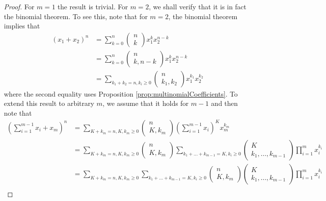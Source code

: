 \begin{proof}
For $m=1$ the result is trivial. For $m=2$, we shall verify that
it is in fact the binomial theorem. To see this, note that for $m=2$,
the binomial theorem implies that 
\begin{align*}
\left(x_{1}+x_{2}\right)^{n} & =\sum_{k=0}^{n}\left(\begin{array}{c}
n\\
k
\end{array}\right)x_{1}^{k}x_{2}^{n-k}\\
 & =\sum_{k=0}^{n}\left(\begin{array}{c}
n\\
k,n-k
\end{array}\right)x_{1}^{k}x_{2}^{n-k}\\
 & =\sum_{k_{1}+k_{2}=n,k_{i}\geq0}\left(\begin{array}{c}
n\\
k_{1},k_{2}
\end{array}\right)x_{1}^{k_{1}}x_{2}^{k_{2}}
\end{align*}
where the second equality uses Proposition \ref{prop:multinomialCoefficients}.
To extend this result to arbitrary $m$, we assume that it holds for
$m-1$ and then note that 
\begin{align*}
\left(\sum_{i=1}^{m-1}x_{i}+x_{m}\right)^{n} & =\sum_{K+k_{m}=n,K,k_{m}\geq0}\left(\begin{array}{c}
n\\
K,k_{m}
\end{array}\right)\left(\sum_{i=1}^{m-1}x_{i}\right)^{K}x_{m}^{k_{m}}\\
 & =\sum_{K+k_{m}=n,K,k_{m}\geq0}\left(\begin{array}{c}
n\\
K,k_{m}
\end{array}\right)\sum_{k_{1}+\ldots+k_{m-1}=K,k_{i}\geq0}\left(\begin{array}{c}
K\\
k_{1},\ldots,k_{m-1}
\end{array}\right)\prod_{i=1}^{m}x_{i}^{k_{i}}\\
 & =\sum_{K+k_{m}=n,K,k_{m}\geq0}\sum_{k_{1}+\ldots+k_{m-1}=K,k_{i}\geq0}\left(\begin{array}{c}
n\\
K,k_{m}
\end{array}\right)\left(\begin{array}{c}
K\\
k_{1},\ldots,k_{m-1}
\end{array}\right)\prod_{i=1}^{m}x_{i}^{k_{i}}\\

\end{align*}
\end{proof}
